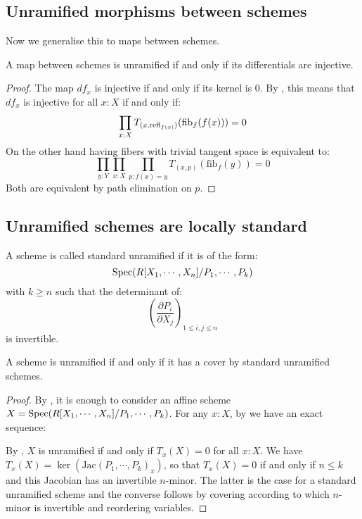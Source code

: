\subsection{Unramified morphisms between schemes}

Now we generalise this to maps between schemes.

\begin{proposition}\label{unramified-map-characterisation}
A map between schemes is unramified if and only if its differentials are injective. 
\end{proposition}

\begin{proof}
The map $df_x$ is injective if and only if its kernel is $0$. By , this means that $df_x$ is injective for all $x:X$ if and only if:
\[
\prod_{x:X}T_{(x,\mathrm{refl}_{f(x)})}(\mathrm{fib}_f(f(x)))=0
\]
On the other hand having fibers with trivial tangent space is equivalent to:
\[
\prod_{y:Y}\prod_{x:X}\prod_{p:f(x)=y} T_{(x,p)}(\mathrm{fib}_f(y)) = 0
\]
Both are equivalent by path elimination on $p$.
\end{proof}


\subsection{Unramified schemes are locally standard}

\begin{definition}
A scheme is called standard unramified if it is of the form:
\[\operatorname{Spec}(R[X_1,\cdots,X_n]/P_1,\cdots,P_k)\]
with $k\geq n$ such that the determinant of:
\[\left( \frac{\partial P_i}{\partial X_j}\right)_{1\leq i,j\leq n}\]
is invertible.
\end{definition}

\begin{proposition}
A scheme is unramified if and only if it has a cover by standard unramified schemes.
\end{proposition}

\begin{proof}
  By , it is enough to consider an affine scheme $X=\operatorname{Spec}(R[X_1,\cdots,X_n]/P_1,\cdots,P_k)$.
  For any $x:X$, by  we have an exact sequence: 
  \begin{center}
  \end{center}
  By , $X$ is unramified if and only if $T_x(X)=0$ for all $x:X$.
  We have $T_x(X)=\ker(\mathrm{Jac}(P_1,\cdots,P_k)_{x})$, so that $T_x(X)=0$ if and only if $n\leq k$ and this Jacobian has an invertible $n$-minor. 
  The latter is the case for a standard unramified scheme and the converse follows by covering according to which $n$-minor is invertible and reordering variables.
\end{proof}


